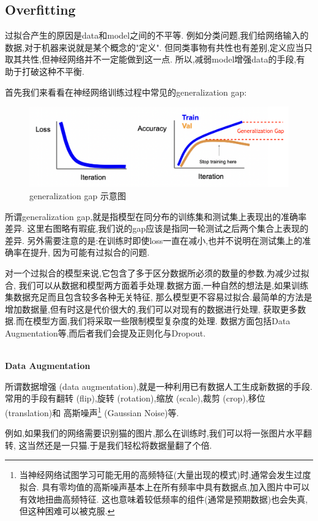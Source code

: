 \subsection{Overfitting}

过拟合产生的原因是data和model之间的不平等.
例如分类问题,我们给网络输入的数据,对于机器来说就是某个概念的"定义".
但同类事物有共性也有差别,定义应当只取其共性,但神经网络并不一定能做到这一点.
所以,减弱model增强data的手段,有助于打破这种不平衡.

首先我们来看看在神经网络训练过程中常见的generalization gap:
\begin{figure}[htbp]
	\centering
	\includegraphics[scale=0.65]{figures/generalgap.png}
	\caption{generalization gap 示意图}
\end{figure}

所谓generalization gap,就是指模型在同分布的训练集和测试集上表现出的准确率差异.
这里右图略有瑕疵,我们说的gap应该是指同一轮测试之后两个集合上表现的差异.
另外需要注意的是:在训练时即使loss一直在减小,也并不说明在测试集上的准确率在提升,
因为可能有过拟合的问题.

对一个过拟合的模型来说,它包含了多于区分数据所必须的数量的参数.为减少过拟合,
我们可以从数据和模型两方面着手处理.数据方面,一种自然的想法是,如果训练集数据充足而且包含较多各种无关特征,
那么模型更不容易过拟合.最简单的方法是增加数据量,但有时这是代价很大的,我们可以对现有的数据进行处理,
获取更多数据.而在模型方面,我们将采取一些限制模型复杂度的处理.
数据方面包括Data Augmentation等,而后者我们会提及正则化与Dropout.

\textbf{\\Data Augmentation}

所谓数据增强 (data augmentation),就是一种利用已有数据人工生成新数据的手段.
常用的手段有翻转 (flip),旋转 (rotation),缩放 (scale),裁剪 (crop),移位 (translation)和
高斯噪声\footnote{当神经网络试图学习可能无用的高频特征(大量出现的模式)时,通常会发生过度拟合.
具有零均值的高斯噪声基本上在所有频率中具有数据点,加入图片中可以有效地扭曲高频特征.
这也意味着较低频率的组件(通常是预期数据)也会失真,但这种困难可以被克服.} (Gaussian Noise)等.

例如,如果我们的网络需要识别猫的图片,那么在训练时,我们可以将一张图片水平翻转,
这当然还是一只猫.于是我们轻松将数据量翻了个倍.

